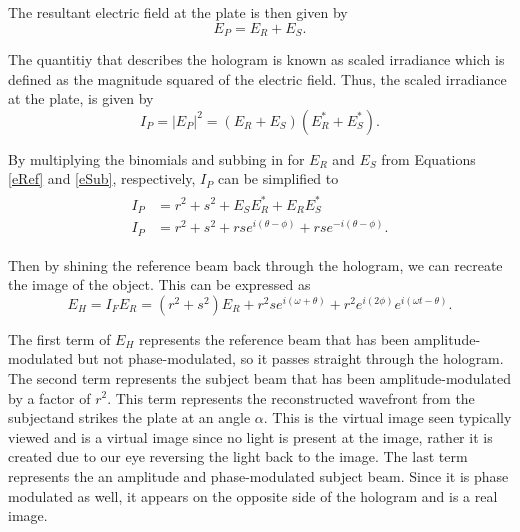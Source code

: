 \documentclass[ notitlepage, numerical, 11pt]{revtex4-1} %
\begin{document}
The resultant electric field at the plate is then given by
\begin{equation}
E_{P} = E_R + E_S.
\label{Ef}
\end{equation}

The quantitiy that describes the hologram is known as scaled irradiance which is defined as the magnitude squared of the electric field. Thus, the scaled irradiance at the plate, is given by
\begin{equation}
I_{P} =  |E_P|^2 = (E_R + E_S) (E^*_{R} + E^*_{S}).
\label{If}
\end{equation}

By multiplying the binomials and subbing in for $E_R$ and $E_S$ from Equations \ref{eRef} and \ref{eSub}, respectively, $I_P$ can be simplified to \cite{optics}
\begin{align}
\begin{split}
I_{P} &= r^2 + s^2 + E_S E^*_R + E_R E^*_S  \\
I_{P} &= r^2 + s^2 + rse^{i(\theta - \phi)} + rse^{-i(\theta - \phi)}.
\end{split}
\label{IfFinal}
\end{align}

Then by shining the reference beam back through the hologram, we can recreate the image of the object. This can be expressed as
\begin{equation}
E_H =  I_F E_R = (r^2 +s ^2)E_R + r^2se^{i(\omega +\theta)} + r^2e^{i(2\phi)}e^{i(\omega t-\theta)}.
\label{Eh}
\end{equation}

The first term of $E_H$ represents the reference beam that has been amplitude-modulated but not phase-modulated, so it passes straight through the hologram. The second term represents the subject beam that has been amplitude-modulated by a factor of $r^2$. This term represents the reconstructed wavefront from the subjectand strikes the plate at an angle $\alpha$. This is the virtual image seen typically viewed and is a virtual image since no light is present at the image, rather it is created due to our eye reversing the light back to the image. The last term represents the an amplitude and phase-modulated subject beam. Since it is phase modulated as well, it appears on the opposite side of the hologram and is a real image. 
\end{document}
